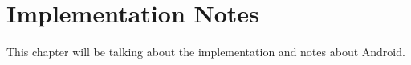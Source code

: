 \chapter{Implementation Notes}

This chapter will be talking about the implementation and notes about Android.